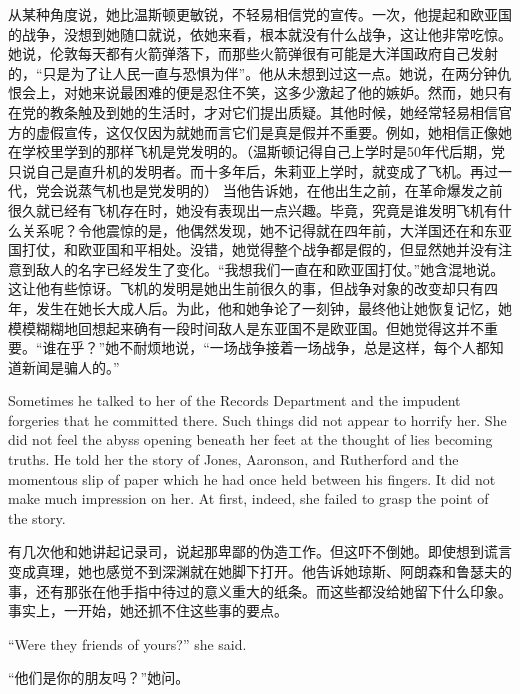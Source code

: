 \begin{paracol}{2}
从某种角度说，她比温斯顿更敏锐，不轻易相信党的宣传。一次，他提起和欧亚国的战争，没想到她随口就说，依她来看，根本就没有什么战争，这让他非常吃惊。她说，伦敦每天都有火箭弹落下，而那些火箭弹很有可能是大洋国政府自己发射的，``只是为了让人民一直与恐惧为伴''。他从未想到过这一点。她说，在两分钟仇恨会上，对她来说最困难的便是忍住不笑，这多少激起了他的嫉妒。然而，她只有在党的教条触及到她的生活时，才对它们提出质疑。其他时候，她经常轻易相信官方的虚假宣传，这仅仅因为就她而言它们是真是假并不重要。例如，她相信正像她在学校里学到的那样飞机是党发明的。（温斯顿记得自己上学时是50年代后期，党只说自己是直升机的发明者。而十多年后，朱莉亚上学时，就变成了飞机。再过一代，党会说蒸气机也是党发明的）
当他告诉她，在他出生之前，在革命爆发之前很久就已经有飞机存在时，她没有表现出一点兴趣。毕竟，究竟是谁发明飞机有什么关系呢？令他震惊的是，他偶然发现，她不记得就在四年前，大洋国还在和东亚国打仗，和欧亚国和平相处。没错，她觉得整个战争都是假的，但显然她并没有注意到敌人的名字已经发生了变化。``我想我们一直在和欧亚国打仗。''她含混地说。这让他有些惊讶。飞机的发明是她出生前很久的事，但战争对象的改变却只有四年，发生在她长大成人后。为此，他和她争论了一刻钟，最终他让她恢复记忆，她模模糊糊地回想起来确有一段时间敌人是东亚国不是欧亚国。但她觉得这并不重要。``谁在乎？''她不耐烦地说，``一场战争接着一场战争，总是这样，每个人都知道新闻是骗人的。''

\switchcolumn*

Sometimes he talked to her of the Records Department and the impudent
forgeries that he committed there. Such things did not appear to horrify
her. She did not feel the abyss opening beneath her feet at the thought
of lies becoming truths. He told her the story of Jones, Aaronson, and
Rutherford and the momentous slip of paper which he had once held
between his fingers. It did not make much impression on her. At first,
indeed, she failed to grasp the point of the story.

\switchcolumn

有几次他和她讲起记录司，说起那卑鄙的伪造工作。但这吓不倒她。即使想到谎言变成真理，她也感觉不到深渊就在她脚下打开。他告诉她琼斯、阿朗森和鲁瑟夫的事，还有那张在他手指中待过的意义重大的纸条。而这些都没给她留下什么印象。事实上，一开始，她还抓不住这些事的要点。

\switchcolumn*

``Were they friends of yours?'' she said.

\switchcolumn

``他们是你的朋友吗？''她问。

\switchcolumn*


\end{paracol}
